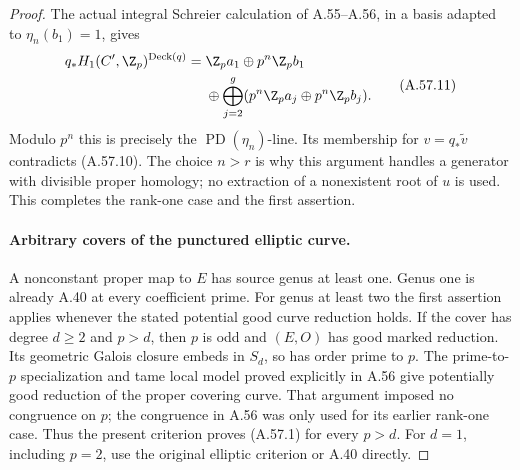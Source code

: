 \begin{proof}
The actual integral Schreier calculation of A.55--A.56,
in a basis adapted to \(\eta_n(b_1)=1\), gives
\[
 \begin{split}
 q_*H_1(C',\Z_p)^{\operatorname{Deck}(q)}
   ={}&\Z_p a_1\oplus p^n\Z_p b_1\\
     &{}\oplus\bigoplus_{j=2}^g
                  (p^n\Z_p a_j\oplus p^n\Z_p b_j).
 \end{split}                                            \tag{A.57.11}
\]
Modulo \(p^n\) this is precisely the
\(\operatorname{PD}(\eta_n)\)-line. Its membership for
\(v=q_*\widetilde v\) contradicts (A.57.10).
The choice \(n>r\) is why this argument handles a
generator with divisible proper homology; no extraction
of a nonexistent root of \(u\) is used. This completes
the rank-one case and the first assertion.

\paragraph{Arbitrary covers of the punctured elliptic curve.}
A nonconstant proper map to \(E\) has source genus at
least one. Genus one is already A.40 at every coefficient
prime. For genus at least two the first assertion applies
whenever the stated potential good curve reduction holds.
If the cover has degree \(d\ge2\) and \(p>d\), then
\(p\) is odd and \((E,O)\) has good marked reduction.
Its geometric Galois closure embeds in \(S_d\), so has
order prime to \(p\). The prime-to-\(p\) specialization
and tame local model proved explicitly in A.56 give
potentially good reduction of the proper covering curve.
That argument imposed no congruence on \(p\); the
congruence in A.56 was only used for its earlier rank-one
case. Thus the present criterion proves (A.57.1) for
every \(p>d\). For \(d=1\), including \(p=2\), use
the original elliptic criterion or A.40 directly.
\end{proof}
